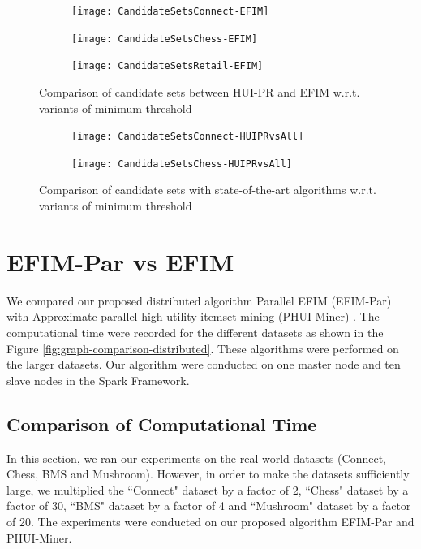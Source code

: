 \documentclass[11pt,openright]{report}
\begin{document}
\begin{figure}
	\centering
	\begin{subfigure}[b]{\textwidth}
		\centering
		\texttt{[image: CandidateSetsConnect-EFIM]}
		\label{fig:connect-candidatesets}
	\end{subfigure}
	\begin{subfigure}[b]{\textwidth}
		\centering
		\texttt{[image: CandidateSetsChess-EFIM]}
		\label{fig:chess-candidatesets}
	\end{subfigure}
	\begin{subfigure}[b]{\textwidth}
		\centering
		\texttt{[image: CandidateSetsRetail-EFIM]}
		\label{fig:retail-candidatesets}
	\end{subfigure}
	\caption{Comparison of candidate sets between HUI-PR and EFIM w.r.t. variants of minimum threshold}
	\label{fig:comparison-candidatesets-efim}
\end{figure}

\begin{figure}
	\centering
	\begin{subfigure}[b]{\textwidth}
		\centering
		\texttt{[image: CandidateSetsConnect-HUIPRvsAll]}
		\label{fig:graph-connect-candidatesets}
		\bigskip
	\end{subfigure}
	\begin{subfigure}[b]{\textwidth}
		\centering
		\texttt{[image: CandidateSetsChess-HUIPRvsAll]}
		\label{fig:graph-chess-candidatesets}
	\end{subfigure}
	\caption{Comparison of candidate sets with state-of-the-art algorithms w.r.t. variants of minimum threshold}
	\label{fig:graph-candidatesets-comparison}
\end{figure}

\section{EFIM-Par vs EFIM}
We compared our proposed distributed algorithm Parallel EFIM (EFIM-Par) with Approximate parallel high utility itemset mining (PHUI-Miner) \cite{Chen2016}. The computational time were recorded for the different datasets as shown in the Figure \ref{fig:graph-comparison-distributed}. These algorithms were performed on the larger datasets. Our algorithm were conducted on one master node and ten slave nodes in the Spark Framework.

\subsection{Comparison of Computational Time}
In this section, we ran our experiments on the real-world datasets (Connect, Chess, BMS and Mushroom). However, in order to make the datasets sufficiently large, we multiplied the ``Connect" dataset by a factor of 2, ``Chess" dataset by a factor of 30, ``BMS" dataset by a factor of 4 and ``Mushroom" dataset by a factor of 20. The experiments were conducted on our proposed algorithm EFIM-Par and PHUI-Miner.
\end{document}
